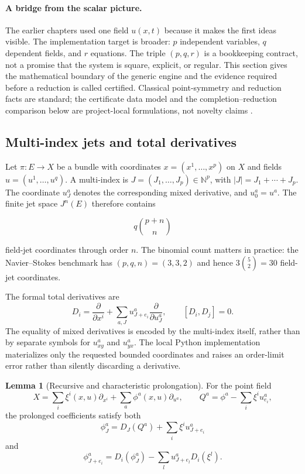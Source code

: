 \documentclass[11pt]{article}
\theoremstyle{definition}
\newtheorem{lemma}[definition]{Lemma}
\theoremstyle{remark}
\begin{document}
\paragraph{A bridge from the scalar picture.}
The earlier chapters used one field $u(x,t)$ because it makes the first ideas visible. The implementation
target is broader: $p$ independent variables, $q$ dependent fields, and $r$ equations. The triple $(p,q,r)$
is a bookkeeping contract, not a promise that the system is square, explicit, or regular. This section gives
the mathematical boundary of the generic engine and the evidence required before a reduction is called
certified. Classical point-symmetry and reduction facts are standard; the certificate data model and the
completion--reduction comparison below are project-local formulations, not novelty claims
\cite{olver1993,blumankumei}.

\subsection{Multi-index jets and total derivatives}

Let $\pi:E\to X$ be a bundle with coordinates $x=(x^1,\ldots,x^p)$ on $X$ and fields
$u=(u^1,\ldots,u^q)$. A multi-index is $J=(J_1,\ldots,J_p)\in\mathbb{N}^p$, with
$|J|=J_1+\cdots+J_p$. The coordinate $u^a_J$ denotes the corresponding mixed derivative, and
$u^a_0=u^a$. The finite jet space $J^n(E)$ therefore contains

\[
  q {p+n\choose n}
\]

field-jet coordinates through order $n$. The binomial count matters in practice: the Navier--Stokes
benchmark has $(p,q,n)=(3,3,2)$ and hence $3{5\choose2}=30$ field-jet coordinates.

The formal total derivatives are
\[
 D_i=\frac{\partial}{\partial x^i}+
 \sum_{a,J}u^a_{J+e_i}\frac{\partial}{\partial u^a_J},
 \qquad [D_i,D_j]=0.
\]
The equality of mixed derivatives is encoded by the multi-index itself, rather than by separate symbols
for $u^a_{xy}$ and $u^a_{yx}$. The local Python implementation materializes only the requested bounded
coordinates and raises an order-limit error rather than silently discarding a derivative.

\begin{lemma}[Recursive and characteristic prolongation]
For the point field
\[
 X=\sum_i\xi^i(x,u)\partial_{x^i}+\sum_a\phi^a(x,u)\partial_{u^a},
 \qquad Q^a=\phi^a-\sum_i\xi^i u^a_{e_i},
\]
the prolonged coefficients satisfy both
\[
 \phi^a_J=D_J(Q^a)+\sum_i\xi^i u^a_{J+e_i}
\]
and
\[
 \phi^a_{J+e_i}=D_i(\phi^a_J)-\sum_l u^a_{J+e_l}D_i(\xi^l).
\]
\end{lemma}
\end{document}
